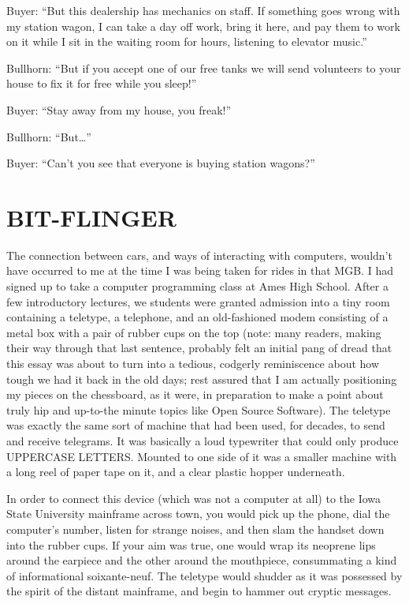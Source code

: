 \documentclass[
  fontsize=11pt,
  paper=landscape,
  twocolumn=true,
  pagesize=pdftex,
  headings=small,
  DIV=15,
  ]{scrartcl}
\begin{document}
Buyer: ``But this dealership has mechanics on staff. If something goes
wrong with my station wagon, I can take a day off work, bring it here,
and pay them to work on it while I sit in the waiting room for hours,
listening to elevator music.''

Bullhorn: ``But if you accept one of our free tanks we will send
volunteers to your house to fix it for free while you sleep!''

Buyer: ``Stay away from my house, you freak!''

Bullhorn: ``But\ldots{}''

Buyer: ``Can't you see that everyone is buying station wagons?''

\section{BIT-FLINGER}

The connection between cars, and ways of interacting with computers,
wouldn't have occurred to me at the time I was being taken for rides in
that MGB. I had signed up to take a computer programming class at Ames
High School. After a few introductory lectures, we students were granted
admission into a tiny room containing a teletype, a telephone, and an
old-fashioned modem consisting of a metal box with a pair of rubber cups
on the top (note: many readers, making their way through that last
sentence, probably felt an initial pang of dread that this essay was
about to turn into a tedious, codgerly reminiscence about how tough we
had it back in the old days; rest assured that I am actually positioning
my pieces on the chessboard, as it were, in preparation to make a point
about truly hip and up-to-the minute topics like Open Source Software).
The teletype was exactly the same sort of machine that had been used,
for decades, to send and receive telegrams. It was basically a loud
typewriter that could only produce UPPERCASE LETTERS. Mounted to one
side of it was a smaller machine with a long reel of paper tape on it,
and a clear plastic hopper underneath.

In order to connect this device (which was not a computer at all) to the
Iowa State University mainframe across town, you would pick up the
phone, dial the computer's number, listen for strange noises, and then
slam the handset down into the rubber cups. If your aim was true, one
would wrap its neoprene lips around the earpiece and the other around
the mouthpiece, consummating a kind of informational soixante-neuf. The
teletype would shudder as it was possessed by the spirit of the distant
mainframe, and begin to hammer out cryptic messages.
\end{document}
